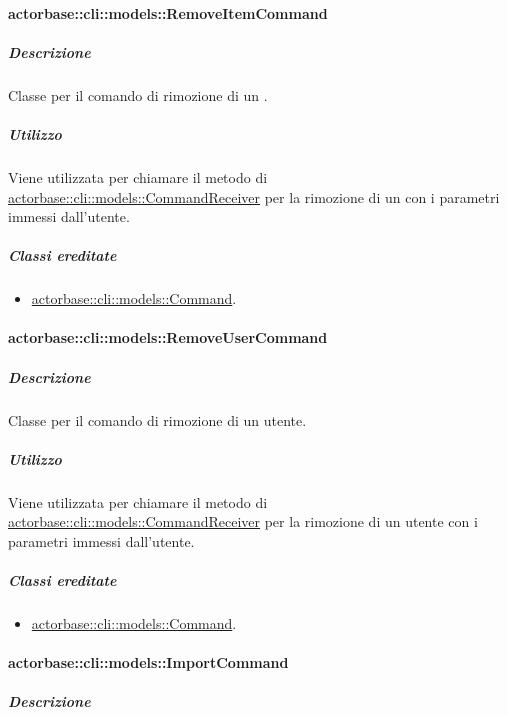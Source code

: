 \documentclass{scalatekids-article}
\begin{document}
\paragraph{actorbase::cli::models::RemoveItemCommand}
\label{sec:actorbase::cli::models::RemoveItemCommand}

\subparagraph{Descrizione}

Classe per il comando di rimozione di un .

\subparagraph{Utilizzo}

Viene utilizzata per chiamare il metodo di
\hyperref[sec:actorbase::cli::models::CommandReceiver]{actorbase::cli::models::CommandReceiver} per la rimozione di un 
con i parametri immessi dall'utente.

\subparagraph{Classi ereditate}

\begin{itemize}
\item \hyperref[sec:actorbase::cli::models::Command]{actorbase::cli::models::Command}.
\end{itemize}

\paragraph{actorbase::cli::models::RemoveUserCommand}
\label{sec:actorbase::cli::models::RemoveUserCommand}

\subparagraph{Descrizione}

Classe per il comando di rimozione di un utente.

\subparagraph{Utilizzo}

Viene utilizzata per chiamare il metodo di
\hyperref[sec:actorbase::cli::models::CommandReceiver]{actorbase::cli::models::CommandReceiver} per la rimozione di un utente con i
parametri immessi dall'utente.

\subparagraph{Classi ereditate}

\begin{itemize}
\item \hyperref[sec:actorbase::cli::models::Command]{actorbase::cli::models::Command}.
\end{itemize}

\paragraph{actorbase::cli::models::ImportCommand}
\label{sec:actorbase::cli::models::ImportCommand}

\subparagraph{Descrizione}
\end{document}

